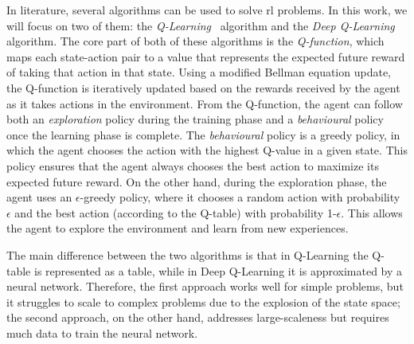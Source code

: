In literature, several algorithms can be used to solve \ac{rl} problems.
 In this work, we will focus on two of them: the \emph{Q-Learning}~\cite{Watkins1992} algorithm and 
 the \emph{Deep Q-Learning}~\cite{dqn} algorithm. 
The core part of both of these algorithms is the \emph{Q-function}, 
 which maps each state-action pair to a value that represents the expected future reward of taking that action in that state.
 Using a modified Bellman equation update, 
 the Q-function is iteratively updated based on the rewards received by the agent as it takes actions in the environment.
%
From the Q-function, 
 the agent can follow both an \emph{exploration} policy during the training phase and a \emph{behavioural} policy once the learning phase is complete. 
 The \emph{behavioural} policy is a greedy policy, 
 in which the agent chooses the action with the highest Q-value in a given state. 
 This policy ensures that the agent always chooses the best action to maximize its expected future reward. 
 On the other hand, during the exploration phase, 
 the agent uses an $\epsilon$-greedy policy, 
 where it chooses a random action with probability $\epsilon$
 and the best action (according to the Q-table) with probability 1-$\epsilon$. This allows the agent to explore the environment and learn from new experiences. 
 
 The main difference between the two algorithms is that in Q-Learning
  the Q-table is represented as a table, while in Deep Q-Learning it is approximated by a neural network.
 Therefore, the first approach works well for simple problems, 
  but it struggles to scale to complex problems due to the explosion of the state space; the second approach, on the other hand, addresses large-scaleness but requires much data to train the neural network.

